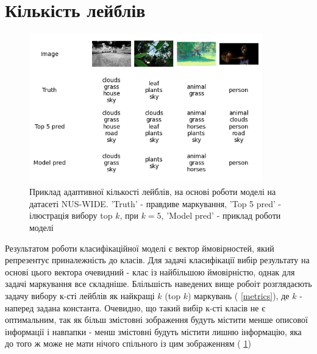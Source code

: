 \documentclass{udstu}
\begin{document}
\clearpage

\section{Кількість лейблів}

\begin{figure}[!ht]
	\centering
	\includegraphics[width=0.9\textwidth]{PNG/test-topk-144}
	\caption{
	Приклад адаптивної кількості лейблів,
	на основі роботи моделі на датасеті NUS-WIDE.
	'Truth' - правдиве маркування,
	'Top 5 pred' - ілюстрація вибору top $k$, при $k=5$,
	'Model pred' - приклад роботи моделі
	}
	\label{figure:test-topk}
\end{figure}

Результатом роботи класифікаційної моделі є вектор ймовірностей, який репрезентує приналежність до класів.
Для задачі класифікації вибір результату на основі цього вектора очевидний - клас із найбільшою ймовірністю, однак
для задачі маркування все складніше.
Блільшість наведених вище робоіт розглядаєють задачу вибору к-сті лейблів як найкращі $k$ (top $k$) маркувань (\chaptername{ \ref{metrics}}),
де $k$ - наперед задана константа. Очевидно, що такий вибір к-сті класів не є оптимальним,
так як більш змістовні зображення будуть містити менше описової інформації і навпапки - менш змістовні будуть
містити лишню інформацію, яка до того ж може не мати нічого спільного із цим зображенням (\figurename{ \ref{figure:test-topk}})
\end{document}
